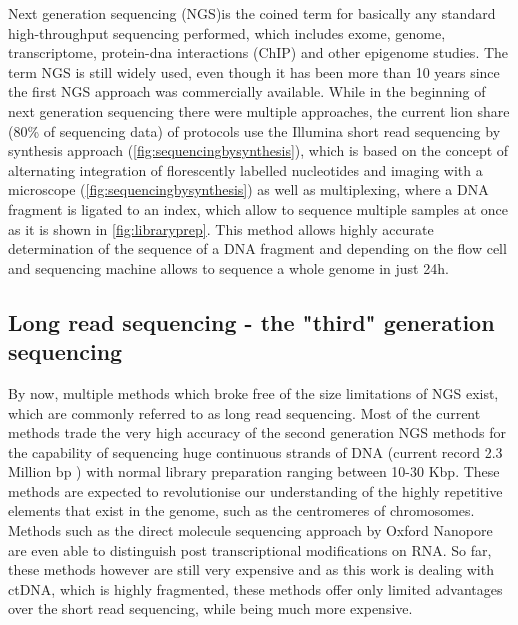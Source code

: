 Next generation sequencing (NGS)is the coined term for basically any standard high-throughput sequencing performed, which includes exome, genome, transcriptome, protein-dna interactions (ChIP) and other epigenome studies. The term NGS is still widely used, even though it has been more than 10 years since the first NGS approach was commercially available. While in the beginning of next generation sequencing there were multiple approaches, the current lion share (80\% of sequencing data) of protocols use the Illumina short read sequencing by synthesis approach (\autoref{fig:sequencingbysynthesis})\cite{Mardis2008,Straiton2019}, which is based on the concept of alternating integration of florescently labelled nucleotides and imaging with a microscope (\autoref{fig:sequencingbysynthesis}) as well as multiplexing, where a DNA fragment is ligated to an index, which allow to sequence multiple samples at once \cite{Church1984,Church1988} as it is shown in \autoref{fig:libraryprep}. This method allows highly accurate determination of the sequence of a DNA fragment and depending on the flow cell and sequencing machine allows to sequence a whole genome in just 24h.

\subsection[Long read sequencing]{Long read sequencing - the "third" generation sequencing}
\label{intro-sec:lrs}
By now, multiple methods which broke free of the size limitations of NGS exist, which are commonly referred to as long read sequencing. Most of the current methods trade the very high accuracy of the second generation NGS methods for the capability of sequencing huge continuous strands of DNA (current record 2.3 Million bp \cite{Payne2018}) with normal library preparation ranging between 10-30 Kbp. 
These methods are expected to revolutionise our understanding of the highly repetitive elements that exist in the genome, such as the centromeres of chromosomes. Methods such as the direct molecule sequencing approach by Oxford Nanopore are even able to distinguish post transcriptional modifications on RNA\cite{Pratanwanich2021}.
So far, these methods however are still very expensive and as this work is dealing with ctDNA, which is highly fragmented, these methods offer only limited advantages over the short read sequencing, while being much more expensive.

